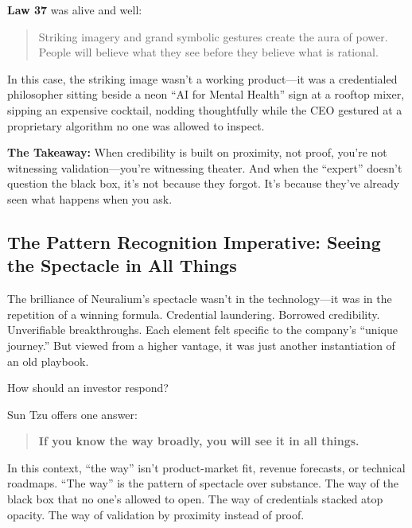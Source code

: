 \medskip

\textbf{Law 37} was alive and well:

\begin{quote}
Striking imagery and grand symbolic gestures create the aura of power. People will believe what they see before they believe what is rational.
\end{quote}

In this case, the striking image wasn’t a working product—it was a credentialed philosopher sitting beside a neon ``AI for Mental Health'' sign at a rooftop mixer, sipping an expensive cocktail, nodding thoughtfully while the CEO gestured at a proprietary algorithm no one was allowed to inspect.

\medskip

\textbf{The Takeaway:}  
When credibility is built on proximity, not proof, you’re not witnessing validation—you’re witnessing theater.  
And when the ``expert'' doesn’t question the black box, it’s not because they forgot.  
It’s because they’ve already seen what happens when you ask.


\subsection{The Pattern Recognition Imperative: Seeing the Spectacle in All Things}

The brilliance of Neuralium’s spectacle wasn’t in the technology—it was in the repetition of a winning formula. Credential laundering. Borrowed credibility. Unverifiable breakthroughs.  
Each element felt specific to the company’s “unique journey.” But viewed from a higher vantage, it was just another instantiation of an old playbook.

How should an investor respond?

Sun Tzu offers one answer:

\begin{quote}
\textbf{If you know the way broadly, you will see it in all things.}
\end{quote}

In this context, “the way” isn’t product-market fit, revenue forecasts, or technical roadmaps.  
“The way” is the pattern of spectacle over substance.  
The way of the black box that no one’s allowed to open.  
The way of credentials stacked atop opacity.  
The way of validation by proximity instead of proof.

\medskip


